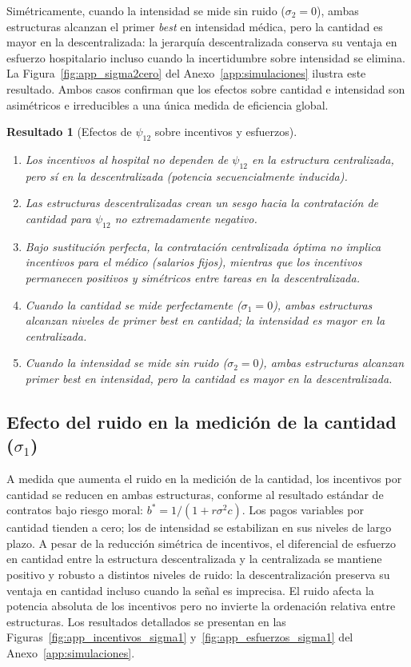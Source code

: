 \documentclass[12pt, a4paper, twoside, openright]{book}
\theoremstyle{plain}
\newtheorem{result}{Resultado}[chapter]
\theoremstyle{definition}
\theoremstyle{remark}
\begin{document}
Simétricamente, cuando la intensidad se mide sin ruido ($\sigma_2=0$), ambas estructuras alcanzan el primer \textit{best} en intensidad médica, pero la cantidad es mayor en la descentralizada: la jerarquía descentralizada conserva su ventaja en esfuerzo hospitalario incluso cuando la incertidumbre sobre intensidad se elimina. La Figura~\ref{fig:app_sigma2cero} del Anexo~\ref{app:simulaciones} ilustra este resultado. Ambos casos confirman que los efectos sobre cantidad e intensidad son asimétricos e irreducibles a una única medida de eficiencia global.

\begin{result}[Efectos de $\psi_{12}$ sobre incentivos y esfuerzos]
\label{res:psi12}
\begin{enumerate}[label=(\alph*)]
  \item Los incentivos al hospital no dependen de $\psi_{12}$ en la estructura centralizada, pero sí en la descentralizada (\textit{potencia secuencialmente inducida}).
  \item Las estructuras descentralizadas crean un sesgo hacia la contratación de cantidad para $\psi_{12}$ no extremadamente negativo.
  \item Bajo sustitución perfecta, la contratación centralizada óptima no implica incentivos para el médico (salarios fijos), mientras que los incentivos permanecen positivos y simétricos entre tareas en la descentralizada.
  \item Cuando la cantidad se mide perfectamente ($\sigma_1=0$), ambas estructuras alcanzan niveles de primer \textit{best} en cantidad; la intensidad es mayor en la centralizada.
  \item Cuando la intensidad se mide sin ruido ($\sigma_2=0$), ambas estructuras alcanzan primer \textit{best} en intensidad, pero la cantidad es mayor en la descentralizada.
\end{enumerate}
\end{result}

\subsection{Efecto del ruido en la medición de la cantidad (\texorpdfstring{$\sigma_1$}{sigma\_1})}

A medida que aumenta el ruido en la medición de la cantidad, los incentivos por cantidad se reducen en ambas estructuras, conforme al resultado estándar de contratos bajo riesgo moral: $b^*=1/(1+r\sigma^2 c)$. Los pagos variables por cantidad tienden a cero; los de intensidad se estabilizan en sus niveles de largo plazo. A pesar de la reducción simétrica de incentivos, el diferencial de esfuerzo en cantidad entre la estructura descentralizada y la centralizada se mantiene positivo y robusto a distintos niveles de ruido: la descentralización preserva su ventaja en cantidad incluso cuando la señal es imprecisa. El ruido afecta la potencia absoluta de los incentivos pero no invierte la ordenación relativa entre estructuras. Los resultados detallados se presentan en las Figuras~\ref{fig:app_incentivos_sigma1} y~\ref{fig:app_esfuerzos_sigma1} del Anexo~\ref{app:simulaciones}.
\end{document}

